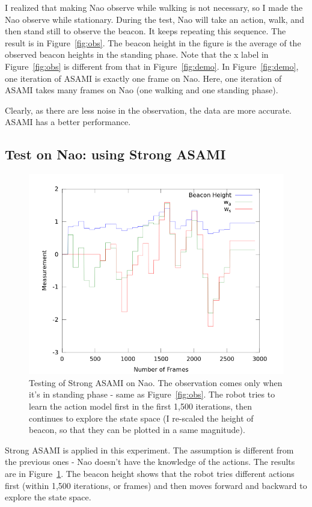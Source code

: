 \documentclass[12pt]{article}
\begin{document}
I realized that making Nao observe while walking is not necessary, so
I made the Nao observe while stationary.
During the test, Nao will take an action, walk, and then stand still
to observe the beacon.
 It keeps repeating
this sequence. The result is in Figure~\ref{fig:obs}.  The 
beacon height in the figure is the average of the observed beacon heights in
the standing phase. Note that the x label in Figure~\ref{fig:obs} is
different from that in Figure~\ref{fig:demo}. In Figure~\ref{fig:demo},
one iteration of ASAMI is exactly one frame on Nao. Here, one
iteration of ASAMI takes many frames on Nao (one walking and one
standing phase).

Clearly, as there are less noise in the observation, the data are more
accurate. ASAMI has a better performance.

\subsection{Test on Nao: using Strong ASAMI}

\begin{figure}[h]
\centering
\includegraphics[width=0.7\columnwidth]{out_strong.png}
\caption{Testing of Strong ASAMI on Nao. The observation comes only
when it's in standing phase - same as Figure~\ref{fig:obs}. The robot
tries to learn the action model first in the first 1,500 iterations,
then continues to explore the state space (I re-scaled the height of
beacon, so that they can be plotted in a same magnitude).}
\label{fig:obs_strong}
\end{figure}

Strong ASAMI is applied in this experiment. The assumption is
different from the previous ones - Nao doesn't have the knowledge of
the actions. The results are in Figure~\ref{fig:obs_strong}. The
beacon height shows that the robot tries different actions
first (within 1,500 iterations, or frames) and then moves forward and
backward to explore the state space.
\end{document}
